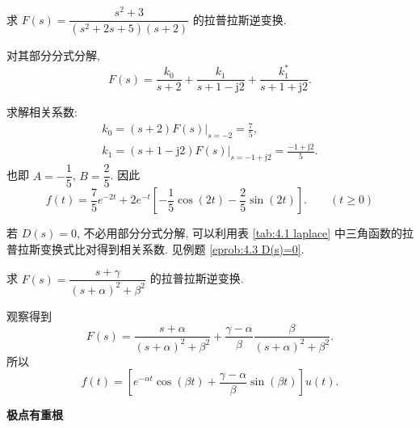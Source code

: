 \begin{exampleprob}
    求 $F(s)=\dfrac{s^2+3}{(s^2+2s+5)(s+2)}$ 的拉普拉斯逆变换.

    \begin{solution}
        对其部分分式分解,
        \begin{equation*}
            F(s)=\frac{k_0}{s+2}+\frac{k_1}{s+1-\mathrm{j}2}+\frac{k_1^*}{s+1+\mathrm{j}2}.
        \end{equation*}

        求解相关系数:
        \begin{gather*}
            k_0=(s+2)F(s)|_{s=-2}=\frac{7}{5}, \\
            k_1=(s+1-\mathrm{j}2)F(s)|_{s=-1+\mathrm{j}2}=\frac{-1+\mathrm{j}2}{5}.
        \end{gather*}
        也即 $A=-\dfrac{1}{5}$, $B=\dfrac{2}{5}$. 因此
        \begin{equation*}
            f(t)=\frac{7}{5}e^{-2t}+2e^{-t}\left[-\frac{1}{5}\cos(2t)-\frac{2}{5}\sin(2t)\right]. \qquad (t\geq 0)
        \end{equation*}
    \end{solution}
\end{exampleprob}

若 $D(s)=0$, 不必用部分分式分解, 可以利用表 \ref{tab:4.1 laplace} 中三角函数的拉普拉斯变换式比对得到相关系数. 见例题 \ref{eprob:4.3 D(s)=0}.

\begin{exampleprob} \label{eprob:4.3 D(s)=0}
    求 $F(s)=\dfrac{s+\gamma}{(s+\alpha)^2+\beta^2}$ 的拉普拉斯逆变换.

    \begin{solution}
        观察得到
        \begin{equation*}
            F(s)=\frac{s+\alpha}{(s+\alpha)^2+\beta^2}+\frac{\gamma-\alpha}{\beta}\frac{\beta}{(s+\alpha)^2+\beta^2}.
        \end{equation*}
        所以
        \begin{equation*}
            f(t)=\left[e^{-\alpha t}\cos(\beta t)+\frac{\gamma-\alpha}{\beta}\sin(\beta t)\right]u(t).
        \end{equation*}
    \end{solution}
\end{exampleprob}

\textbf{极点有重根}

